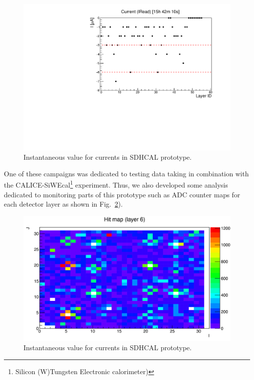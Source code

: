 \documentclass[conference]{IEEEtran}
\begin{document}
\begin{figure}[htbp]
  \begin{center}
    \includegraphics[width=0.95\linewidth]{figs/DQM_SDHCAL_Current_SC13.pdf}
    \caption{\label{fig:DQMCurrents} Instantaneous value for currents in SDHCAL prototype.}
  \end{center}
\end{figure}

One of these campaigns was dedicated to testing data taking in combination with the CALICE-SiWEcal\footnote{Silicon (W)Tungsten Electronic calorimeter)} experiment. Thus, we also developed some analysis dedicated to monitoring parts of this prototype such as ADC counter maps for each detector layer as shown in  Fig.~\ref{fig:DQMEcalDisplay}).




\begin{figure}[htbp]
  \begin{center}
    \includegraphics[width=\linewidth]{figs/DQM_SDHCAL_ECAL_HitMap6_I732891.pdf}
    \caption{\label{fig:DQMEcalDisplay} Instantaneous value for currents in SDHCAL prototype.}
  \end{center}
\end{figure}
\end{document}
